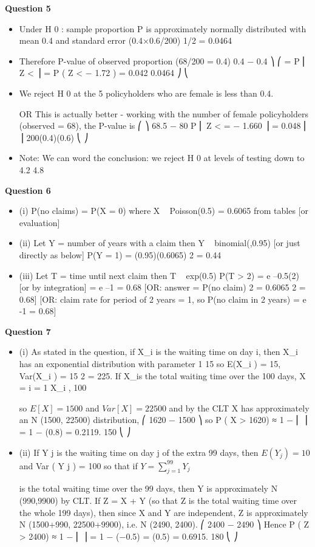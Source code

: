 \documentclass[a4paper,12pt]{article}
\begin{document}
\noindent \textbf{Question 5}
\begin{itemize}
\item Under H 0 : sample proportion P is approximately normally distributed with mean 0.4 and standard error (0.4×0.6/200) 1/2 = 0.0464
\item Therefore P-value of observed proportion (68/200 = 0.4)
0.4 − 0.4 ⎞
⎛
= P ⎜ Z <
⎟ = P ( Z < − 1.72 ) = 0.042
0.0464 ⎠
⎝
\item We reject H 0 at the 5%
policyholders who are female is less than 0.4.
\item [OR This is actually better - working with the number of female policyholders
(observed = 68), the P-value is
⎛
⎞
68.5 − 80
P ⎜ Z <
= − 1.660 ⎟ = 0.048
⎜
⎟
200(0.4)(0.6)
⎝
⎠
]
\item Note: We can word the conclusion: we reject H 0 at levels of testing down to 4.2%
4.8%
\end{itemize}
\noindent \textbf{Question 6}
\begin{itemize}
\item (i) P(no claims) = P(X = 0) where X ~ Poisson(0.5)
= 0.6065 from tables [or evaluation]
\item (ii) Let Y = number of years with a claim
then Y ~ binomial(,0.95) [or just directly as below]
P(Y = 1) = (0.95)(0.6065) 2 = 0.44
\item (iii)
Let T = time until next claim
then T ~ exp(0.5)
P(T > 2) = e –0.5(2) [or by integration]
= e –1 = 0.68
[OR: answer = {P(no claim)} 2 = 0.6065 2 = 0.68]
[OR: claim rate for period of 2 years = 1, so P(no claim in 2 years)
= e -1 = 0.68]
\end{itemize}
\noindent \textbf{Question 7}
\begin{itemize}
\item (i)
As stated in the question, if X_{i} is the waiting time on day i, then X_{i} has an
exponential distribution with parameter
1
15
so E(X_{i} ) = 15, Var(X_{i} ) = 15 2 = 225.
If X_{i}s the total waiting time over the 100 days, X = \sum i = 1 X_{i} ,
100


so $E [ X ] = 1500$ and $Var [ X ] = 22500$ and by the CLT
X has approximately an N (1500, 22500) distribution,
⎛ 1620 − 1500 ⎞
so P ( X > 1620) ≈ 1 − \Phi ⎜
⎟ = 1 − \Phi(0.8) = 0.2119.
150
⎝
⎠
\item (ii)
If Y j is the waiting time on day j of the extra 99 days, then $E ( Y_j ) = 10$ and
Var ( Y j ) = 100 so that if $Y =
\sum^{99}_{j = 1} Y_j$

is the total waiting time over the 99 days,
then Y is approximately N (990,9900) by CLT.
If Z = X + Y (so that Z is the total waiting time over the whole 199 days), then
since X and Y are independent, Z is approximately N (1500+990, 22500+9900),
i.e. N (2490, 2400).
⎛ 2400 − 2490 ⎞
Hence P ( Z > 2400) ≈ 1 − \Phi ⎜
⎟ = 1 − \Phi(−0.5) = \Phi(0.5) = 0.6915.
180
⎝
⎠
\end{itemize}
\end{document}
